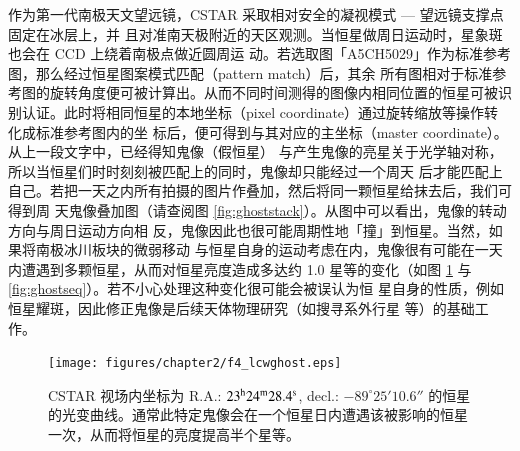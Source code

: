 作为第一代南极天文望远镜，CSTAR 采取相对安全的凝视模式 --- 望远镜支撑点固定在冰层上，并
且对准南天极附近的天区观测。当恒星做周日运动时，星象斑也会在 CCD 上绕着南极点做近圆周运
动。若选取图「A5CH5029」作为标准参考图，那么经过恒星图案模式匹配（pattern match）后，其余
所有图相对于标准参考图的旋转角度便可被计算出。从而不同时间测得的图像内相同位置的恒星可被识
别认证。此时将相同恒星的本地坐标（pixel coordinate）通过旋转缩放等操作转化成标准参考图内的坐
标后，便可得到与其对应的主坐标（master coordinate）。从上一段文字中，已经得知鬼像（假恒星）
与产生鬼像的亮星关于光学轴对称，所以当恒星们时时刻刻被匹配上的同时，鬼像却只能经过一个周天
后才能匹配上自己。若把一天之内所有拍摄的图片作叠加，然后将同一颗恒星给抹去后，我们可得到周
天鬼像叠加图（请查阅图 \ref{fig:ghoststack}）。从图中可以看出，鬼像的转动方向与周日运动方向相
反，鬼像因此也很可能周期性地「撞」到恒星。当然，如果将南极冰川板块的微弱移动\cite{ZhouX2013}
与恒星自身的运动考虑在内，鬼像很有可能在一天内遭遇到多颗恒星，从而对恒星亮度造成多达约 1.0 
星等的变化（如图 \ref{fig:lcwghost} 与 \ref{fig:ghostseq}）。若不小心处理这种变化很可能会被误认为恒
星自身的性质，例如恒星耀斑\cite{Liang2016}，因此修正鬼像是后续天体物理研究（如搜寻系外行星
\cite{Wang2014CSTAR} 等）的基础工作。

\begin{figure}[t]
\centering
\texttt{[image: figures/chapter2/f4\_lcwghost.eps]}
\caption{CSTAR 视场内坐标为 R.A.: $23^\mathrm{h}24^\mathrm{m}28.4^\mathrm{s}$, decl.: $-89^{\circ}25'10.6''$ 的恒星的光变曲线。通常此特定鬼像会在一个恒星日内遭遇该被影响的恒星一次，从而将恒星的亮度提高半个星等。}
\label{fig:lcwghost}
\end{figure}







